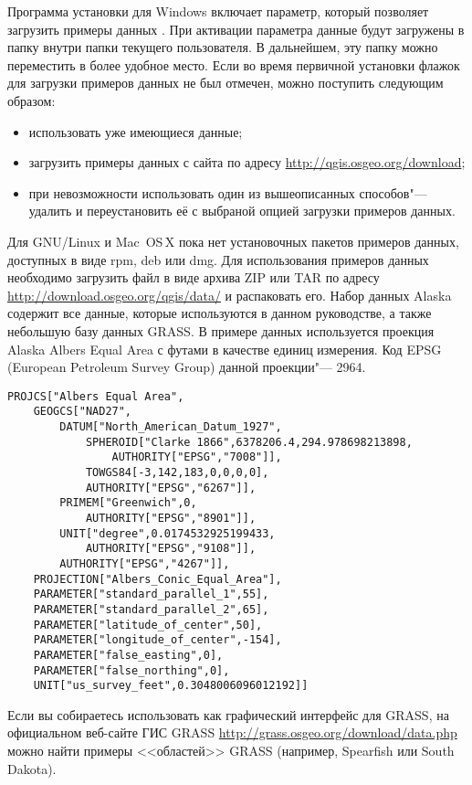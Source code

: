 \win Программа установки для Windows включает параметр, который позволяет
загрузить примеры данных \qg. При активации параметра данные будут загружены в папку
 внутри папки 
текущего пользователя. В дальнейшем, эту папку можно переместить в более
удобное место. Если во время первичной установки \qg флажок для загрузки
примеров данных не был отмечен, можно поступить следующим образом:
\begin{itemize}[label=--]
\item использовать уже имеющиеся данные;
\item загрузить примеры данных с сайта \qg по адресу \url{http://qgis.osgeo.org/download};
\item при невозможности использовать один из вышеописанных способов"---
удалить \qg и переустановить её с выбраной опцией загрузки примеров данных.
\end{itemize}

\nix \osx Для GNU/Linux и Mac~OS\,X пока нет установочных пакетов
примеров данных, доступных в виде rpm, deb или dmg. Для использования
примеров данных необходимо загрузить файл 
в виде архива ZIP или TAR по адресу
\url{http://download.osgeo.org/qgis/data/} и распаковать его. Набор
данных Alaska содержит все данные, которые используются в данном руководстве,
а также небольшую базу данных GRASS. В примере данных используется
проекция Alaska Albers Equal Area с футами в качестве единиц измерения.
Код EPSG (European Petroleum Survey Group) данной проекции"--- 2964.

\begin{verbatim}
PROJCS["Albers Equal Area",
    GEOGCS["NAD27",
        DATUM["North_American_Datum_1927",
            SPHEROID["Clarke 1866",6378206.4,294.978698213898,
                AUTHORITY["EPSG","7008"]],
            TOWGS84[-3,142,183,0,0,0,0],
            AUTHORITY["EPSG","6267"]],
        PRIMEM["Greenwich",0,
            AUTHORITY["EPSG","8901"]],
        UNIT["degree",0.0174532925199433,
            AUTHORITY["EPSG","9108"]],
        AUTHORITY["EPSG","4267"]],
    PROJECTION["Albers_Conic_Equal_Area"],
    PARAMETER["standard_parallel_1",55],
    PARAMETER["standard_parallel_2",65],
    PARAMETER["latitude_of_center",50],
    PARAMETER["longitude_of_center",-154],
    PARAMETER["false_easting",0],
    PARAMETER["false_northing",0],
    UNIT["us_survey_feet",0.3048006096012192]]
\end{verbatim}

Если вы собираетесь использовать \qg как графический интерфейс для
GRASS, на официальном веб-сайте ГИС GRASS
\url{http://grass.osgeo.org/download/data.php} можно найти примеры
<<областей>> GRASS (например, Spearfish или South Dakota).

